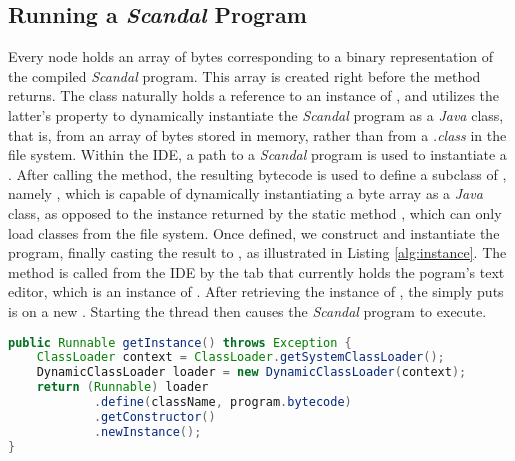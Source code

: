 \subsection{Running a \emph{Scandal} Program}

Every  node holds an array of bytes corresponding to a binary representation of the compiled \emph{Scandal} program. This array is created right before the  method returns. The  class naturally holds a reference to an instance of , and utilizes the latter's  property to dynamically instantiate the \emph{Scandal} program as a \emph{Java} class, that is, from an array of bytes stored in memory, rather than from a \emph{.class} in the file system. Within the IDE, a path to a \emph{Scandal} program is used to instantiate a . After calling the  method, the resulting bytecode is used to define a subclass of , namely , which is capable of dynamically instantiating a byte array as a \emph{Java} class, as opposed to the instance returned by the static method , which can only load classes from the file system. Once defined, we construct and instantiate the program, finally casting the result to , as illustrated in Listing \ref{alg:instance}. The  method is called from the IDE by the tab that currently holds the pogram's text editor, which is an instance of . After retrieving the instance of , the  simply puts is on a new . Starting the thread then causes the \emph{Scandal} program to execute.

\begin{lstlisting}[language=Java,caption={Obtaining an instance of a \emph{Scandal} program.},label={alg:instance}]
public Runnable getInstance() throws Exception {
	ClassLoader context = ClassLoader.getSystemClassLoader();
	DynamicClassLoader loader = new DynamicClassLoader(context);
	return (Runnable) loader
			.define(className, program.bytecode)
			.getConstructor()
			.newInstance();
}
\end{lstlisting}
